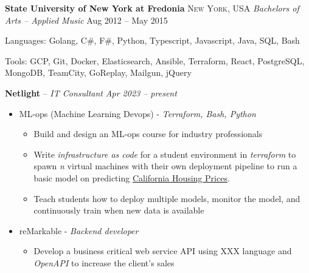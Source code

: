 \documentclass[10pt,letterpaper]{article}
\begin{document}

\headedsection
{\textbf{State University of New York at Fredonia}}
{\textsc{New York, USA}} {
	\headedsubsection
	{\textit{Bachelors of Arts -- Applied Music}}
	{Aug 2012 -- May 2015}
	{\bodytext{}}
}
\vspace{-5mm}


\spacedhrule{0.6em}{-0.7em}


\inlineheadsection
{Languages:}
{Golang, C\#, F\#, Python, Typescript, Javascript, Java, SQL, Bash}
\vspace{.9em}


\inlineheadsection
{Tools:}
{GCP, Git, Docker, Elasticsearch, Ansible, Terraform, React, PostgreSQL, MongoDB, TeamCity, GoReplay, Mailgun, jQuery}
\vspace{0.5em}


\spacedhrule{1em}{-1em}



\headedsection
{\textbf{Netlight} -- \textit{IT Consultant}}
{\textit{Apr 2023 -- present}} {
	\begin{itemize}[noitemsep,nolistsep]
		\item ML-ops (Machine Learning Devops) - {\it Terraform, Bash, Python}
			\begin{itemize}[noitemsep,nolistsep]
				\item Build and design an ML-ops course for industry professionals
				\item Write {\it infrastructure as code} for a student environment in {\it terraform} to spawn {\it n} virtual machines with their own deployment pipeline to run a basic model on predicting \href{https://www.kaggle.com/datasets/camnugent/california-housing-prices}{California Housing Prices}.
				\item Teach students how to deploy multiple models, monitor the model, and continuously train when new data is available
			\end{itemize}
		\item reMarkable - {\it Backend developer}
			\begin{itemize}[noitemsep,nolistsep]
				\item Develop a business critical web service API using XXX language and {\it OpenAPI} to increase the client's sales
			\end{itemize}
	\end{itemize}
}
\vspace{-1mm}
\end{document}
